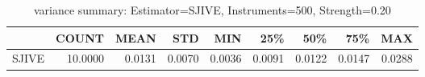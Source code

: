 \begin{table}[ht]
\centering
\caption{variance summary: Estimator=SJIVE, Instruments=500, Strength=0.20}
\begin{tabular}{lrrrrrrrr}
\toprule
 & COUNT & MEAN & STD & MIN & 25\% & 50\% & 75\% & MAX \\
\midrule
SJIVE & 10.0000 & 0.0131 & 0.0070 & 0.0036 & 0.0091 & 0.0122 & 0.0147 & 0.0288 \\
\bottomrule
\end{tabular}
\end{table}
